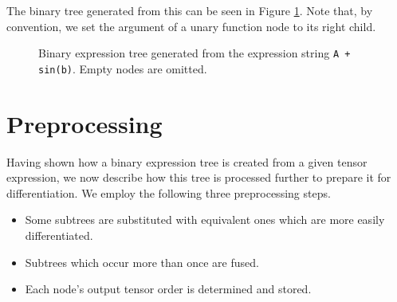 \documentclass[12pt, a4paper]{report}
\begin{document}
The binary tree generated from this can be seen in Figure \ref{fig:tree_example}.
Note that, by convention, we set the argument of a unary function node to its right child.

\begin{figure}
    \centering
    \caption{Binary expression tree generated from the expression string \texttt{A + sin(b)}. Empty nodes are omitted.}
    \label{fig:tree_example}
\end{figure}

\section{Preprocessing}
Having shown how a binary expression tree is created from a given tensor expression, we now describe how this tree is processed further to prepare it for differentiation.
We employ the following three preprocessing steps.
\begin{itemize}
    \item Some subtrees are substituted with equivalent ones which are more easily differentiated.
    \item Subtrees which occur more than once are fused.
    \item Each node's output tensor order is determined and stored.
\end{itemize}
\end{document}
